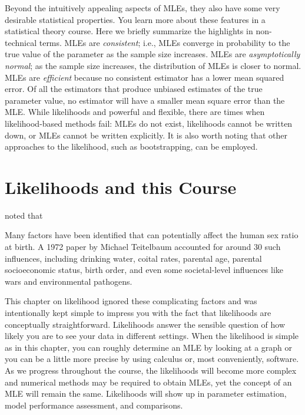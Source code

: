 \documentclass[
]{krantz}
\renewenvironment{quote}{\begin{VF}}{\end{VF}}
\begin{document}
Beyond the intuitively appealing aspects of MLEs, they also have some very desirable statistical properties. You learn more about these features in a statistical theory course. Here we briefly summarize the highlights in non-technical terms. MLEs are \emph{consistent}; i.e., MLEs converge in probability to the true value of the parameter as the sample size increases. MLEs are \emph{asymptotically normal}; as the sample size increases, the distribution of MLEs is closer to normal. MLEs are \emph{efficient} because no consistent estimator has a lower mean squared error. Of all the estimators that produce unbiased estimates of the true parameter value, no estimator will have a smaller mean square error than the MLE. While likelihoods and powerful and flexible, there are times when likelihood-based methods fail: MLEs do not exist, likelihoods cannot be written down, or MLEs cannot be written explicitly. It is also worth noting that other approaches to the likelihood, such as bootstrapping, can be employed.

\hypertarget{likelihoods-and-this-course}{%
\section{Likelihoods and this Course}\label{likelihoods-and-this-course}}

\citet{Rodgers2001} noted that

\begin{quote}
Many factors have been identified that can potentially affect the human sex
ratio at birth. A 1972 paper by Michael Teitelbaum accounted for around 30
such influences, including drinking water, coital rates, parental age, parental
socioeconomic status, birth order, and even some societal-level influences like
wars and environmental pathogens.
\end{quote}

This chapter on likelihood ignored these complicating factors and was intentionally kept simple to impress you with the fact that likelihoods are conceptually straightforward. Likelihoods answer the sensible question of how likely you are to see your data in different settings. When the likelihood is simple as in this chapter, you can roughly determine an MLE by looking at a graph or you can be a little more precise by using calculus or, most conveniently, software. As we progress throughout the course, the likelihoods will become more complex and numerical methods may be required to obtain MLEs, yet the concept of an MLE will remain the same. Likelihoods will show up in parameter estimation, model performance assessment, and comparisons.
\end{document}
